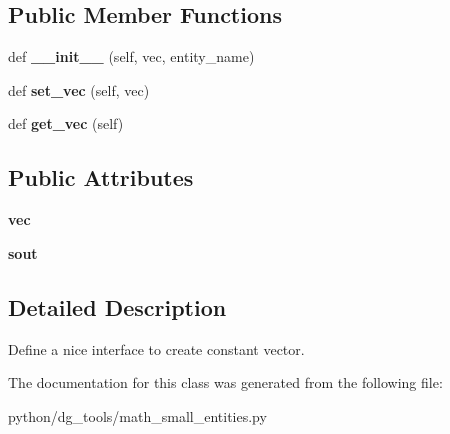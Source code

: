 \subsection*{Public Member Functions}
\begin{DoxyCompactItemize}
\item 
def {\bfseries \+\_\+\+\_\+init\+\_\+\+\_\+} (self, vec, entity\+\_\+name)\hypertarget{classpython_1_1dg__tools_1_1math__small__entities_1_1ConstantVector_ae06311463a671fb82d7172d26943da37}{}\label{classpython_1_1dg__tools_1_1math__small__entities_1_1ConstantVector_ae06311463a671fb82d7172d26943da37}

\item 
def {\bfseries set\+\_\+vec} (self, vec)\hypertarget{classpython_1_1dg__tools_1_1math__small__entities_1_1ConstantVector_a584f02de2615a0265e56ba489b4df335}{}\label{classpython_1_1dg__tools_1_1math__small__entities_1_1ConstantVector_a584f02de2615a0265e56ba489b4df335}

\item 
def {\bfseries get\+\_\+vec} (self)\hypertarget{classpython_1_1dg__tools_1_1math__small__entities_1_1ConstantVector_a551e44e0f03aa4283783d9694aac973e}{}\label{classpython_1_1dg__tools_1_1math__small__entities_1_1ConstantVector_a551e44e0f03aa4283783d9694aac973e}

\end{DoxyCompactItemize}
\subsection*{Public Attributes}
\begin{DoxyCompactItemize}
\item 
{\bfseries vec}\hypertarget{classpython_1_1dg__tools_1_1math__small__entities_1_1ConstantVector_a4a8d243668df79c77799583641991fae}{}\label{classpython_1_1dg__tools_1_1math__small__entities_1_1ConstantVector_a4a8d243668df79c77799583641991fae}

\item 
{\bfseries sout}\hypertarget{classpython_1_1dg__tools_1_1math__small__entities_1_1ConstantVector_a8b292e537665662d7697d2d9e572ece1}{}\label{classpython_1_1dg__tools_1_1math__small__entities_1_1ConstantVector_a8b292e537665662d7697d2d9e572ece1}

\end{DoxyCompactItemize}


\subsection{Detailed Description}
Define a nice interface to create constant vector. 

The documentation for this class was generated from the following file\+:\begin{DoxyCompactItemize}
\item 
python/dg\+\_\+tools/math\+\_\+small\+\_\+entities.\+py\end{DoxyCompactItemize}
